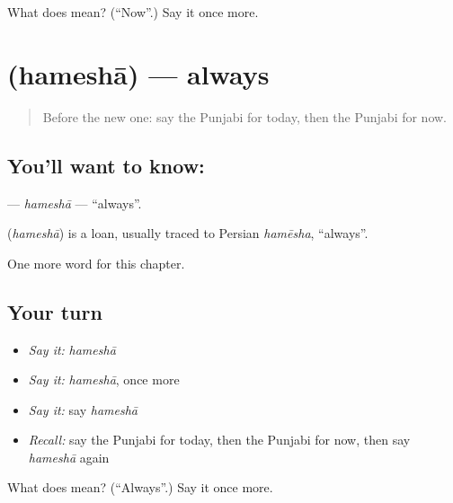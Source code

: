 \begin{tcolorbox}[breakable,colback=teal!4,colframe=teal!35!black,title={Before you move on}]
What does  mean? (\textquotedblleft{}Now\textquotedblright{}.) Say it once more.
\end{tcolorbox}
\section[\texorpdfstring{\pa{ਹਮੇਸ਼ਾ} (hameshā)}{ਹਮੇਸ਼ਾ (hameshā)}]{ (hameshā) — always}

\label{lesson:PA-C87-hamesha}



\begin{quote}
Before the new one: say the Punjabi for today, then the Punjabi for now.
\end{quote}

\subsection*{You'll want to know: }
\textbf{} — \emph{hameshā} — \textquotedblleft{}always\textquotedblright{}.

\begin{cousinweb}
\textbf{} (\emph{hameshā}) is a loan, usually traced to Persian \emph{hamēsha}, \textquotedblleft{}always\textquotedblright{}.
\end{cousinweb}

\begin{grammarlens}[title={What you've built}]
One more word for this chapter.
\end{grammarlens}

\subsection*{Your turn}
\begin{itemize}
\raggedright
  \item \emph{Say it:} \emph{hameshā}
  \item \emph{Say it:} \emph{hameshā}, once more
  \item \emph{Say it:} say \emph{hameshā}
  \item \emph{Recall:} say the Punjabi for today, then the Punjabi for now, then say \emph{hameshā} again
\end{itemize}

\begin{tcolorbox}[breakable,colback=teal!4,colframe=teal!35!black,title={Before you move on}]
What does  mean? (\textquotedblleft{}Always\textquotedblright{}.) Say it once more.
\end{tcolorbox}
